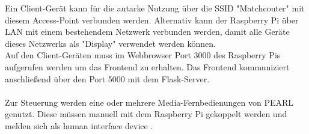 Ein Client-Gerät kann für die autarke Nutzung über die SSID "Matchcouter" mit diesem Access-Point verbunden werden. Alternativ kann der Raspberry Pi über LAN mit einem bestehendem Netzwerk verbunden werden, damit alle Geräte dieses Netzwerks als "Display" verwendet werden können. \\
Auf den Client-Geräten muss im Webbrowser Port 3000 des Raspberry Pis aufgerufen werden um das Frontend zu erhalten. Das Frontend kommuniziert anschließend über den Port 5000 mit dem Flask-Server.\\
\\
Zur Steuerung werden eine oder mehrere Media-Fernbedienungen von PEARL genutzt. Diese müssen manuell mit dem Raspberry Pi gekoppelt werden und melden sich als \glqq human interface device\grqq{} .
             